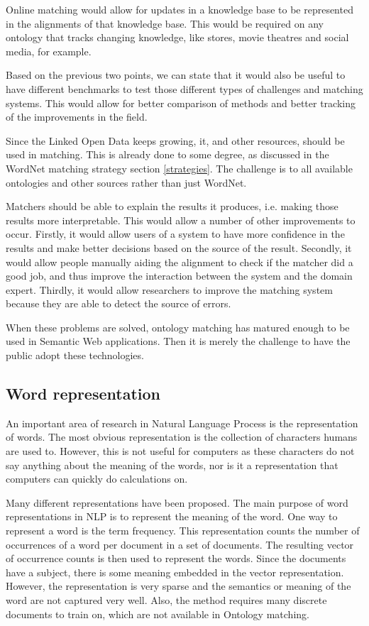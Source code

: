 \documentclass{article}
\begin{document}
 Online matching would allow for updates in a knowledge base to be represented in the alignments of that knowledge base. This would be required on any ontology that tracks changing knowledge, like stores, movie theatres and social media, for example.
 
 Based on the previous two points, we can state that it would also be useful to have different benchmarks to test those different types of challenges and matching systems. This would allow for better comparison of methods and better tracking of the improvements in the field.
 
 Since the Linked Open Data keeps growing, it, and other resources, should be used in matching. This is already done to some degree, as discussed in the WordNet matching strategy section \ref{strategies}. The challenge is to all available ontologies and other sources rather than just WordNet.
 
 Matchers should be able to explain the results it produces, i.e. making those results more interpretable. This would allow a number of other improvements to occur. Firstly, it would allow users of a system to have more confidence in the results and make better decisions based on the source of the result. Secondly, it would allow people manually aiding the alignment to check if the matcher did a good job, and thus improve the interaction between the system and the domain expert. Thirdly, it would allow researchers to improve the matching system because they are able to detect the source of errors.
 
 When these problems are solved, ontology matching has matured enough to be used in Semantic Web applications. Then it is merely the challenge to have the public adopt these technologies.
 
 \subsection{Word representation} \label{w2v}
 An important area of research in Natural Language Process is the representation of words. The most obvious representation is the collection of characters humans are used to. However, this is not useful for computers as these characters do not say anything about the meaning of the words, nor is it a representation that computers can quickly do calculations on.
 
 Many different representations have been proposed. The main purpose of word representations in NLP is to represent the meaning of the word. One way to represent a word is the term frequency. This representation counts the number of occurrences of a word per document in a set of documents. The resulting vector of occurrence counts is then used to represent the words. Since the documents have a subject, there is some meaning embedded in the vector representation. However, the representation is very sparse and the semantics or meaning of the word are not captured very well. Also, the method requires many discrete documents to train on, which are not available in Ontology matching.
 
\end{document}
